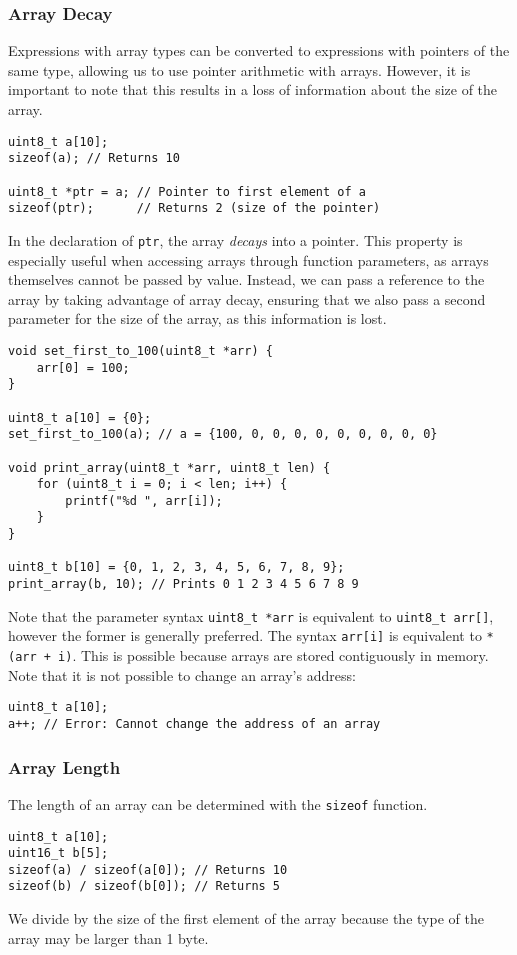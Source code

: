 \documentclass{article}
\begin{document}
\subsubsection{Array Decay}
Expressions with array types can be converted to expressions with
pointers of the same type, allowing us to use pointer arithmetic with
arrays. However, it is important to note that this results in a loss of
information about the size of the array.
\begin{verbatim}
uint8_t a[10];
sizeof(a); // Returns 10

uint8_t *ptr = a; // Pointer to first element of a
sizeof(ptr);      // Returns 2 (size of the pointer)
\end{verbatim}
In the declaration of \texttt{ptr}, the array \textit{decays}
into a pointer. This property is especially useful when accessing arrays
through function parameters, as arrays themselves cannot be passed by
value. Instead, we can pass a reference to the array by taking advantage
of array decay, ensuring that we also pass a second parameter for the
size of the array, as this information is lost.
\begin{verbatim}
void set_first_to_100(uint8_t *arr) {
    arr[0] = 100;
}

uint8_t a[10] = {0};
set_first_to_100(a); // a = {100, 0, 0, 0, 0, 0, 0, 0, 0, 0}

void print_array(uint8_t *arr, uint8_t len) {
    for (uint8_t i = 0; i < len; i++) {
        printf("%d ", arr[i]);
    }
}

uint8_t b[10] = {0, 1, 2, 3, 4, 5, 6, 7, 8, 9};
print_array(b, 10); // Prints 0 1 2 3 4 5 6 7 8 9
\end{verbatim}
Note that the parameter syntax \texttt{uint8_t *arr} is
equivalent to \texttt{uint8_t arr[]}, however the former is
generally preferred. The syntax \texttt{arr[i]} is
equivalent to \texttt{*(arr + i)}. This is possible because
arrays are stored contiguously in memory. Note that it is not possible
to change an array's address:
\begin{verbatim}
uint8_t a[10];
a++; // Error: Cannot change the address of an array
\end{verbatim}
\subsubsection{Array Length}
The length of an array can be determined with the
\texttt{sizeof} function.
\begin{verbatim}
uint8_t a[10];
uint16_t b[5];
sizeof(a) / sizeof(a[0]); // Returns 10
sizeof(b) / sizeof(b[0]); // Returns 5
\end{verbatim}
We divide by the size of the first element of the array because the
type of the array may be larger than 1 byte.
\end{document}
